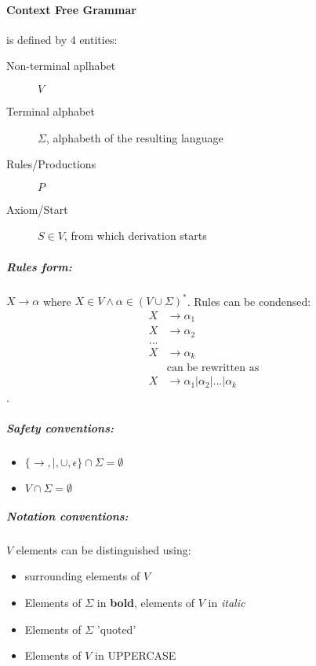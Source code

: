 \documentclass{article}
\begin{document}
\paragraph{Context Free Grammar} is defined by 4 entities:
\begin{description}
\item[Non-terminal aplhabet] $V$
\item[Terminal alphabet] $\Sigma$, alphabeth of the resulting language
\item[Rules/Productions] $P$
\item[Axiom/Start] $S\in V$, from which derivation starts
\end{description}
\subparagraph{Rules form: }$X \rightarrow \alpha$ where $X \in V \wedge \alpha \in (V \cup \Sigma)^*$. Rules can be condensed:
\begin{align*}
X &\rightarrow \alpha_1\\
X &\rightarrow \alpha_2\\
...\\
X &\rightarrow \alpha_k\\
&\text{can be rewritten as}\\
X &\rightarrow \alpha_1 | \alpha_2 | ... | \alpha_k
\end{align*}.
\subparagraph{Safety conventions:}
\begin{itemize}
\item $\{\rightarrow, |, \cup, \epsilon\} \cap \Sigma = \emptyset$
\item $V \cap \Sigma = \emptyset$
\end{itemize}
\subparagraph{Notation conventions:}
$V$ elements can be distinguished using:
\begin{itemize}
\item <Angle brackets> surrounding elements of $V$
\item Elements of $\Sigma$ in \textbf{bold}, elements of $V$ in \textit{italic}
\item Elements of $\Sigma$ 'quoted'
\item Elements of $V$ in UPPERCASE
\end{itemize}
\end{document}
